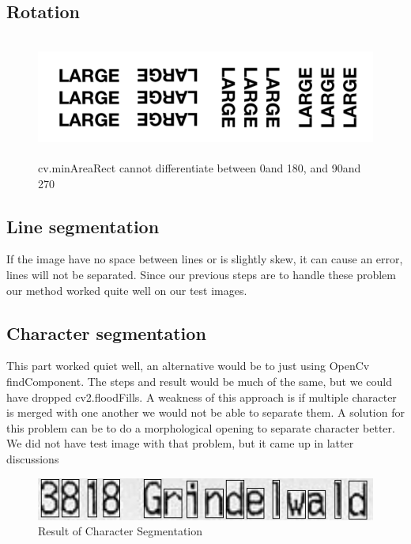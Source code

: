 \documentclass[Report.tex]{subfiles}
\begin{document}
\subsection{Rotation}
\begin{figure}[H]
  \centering
  \includegraphics[height=4cm]{res/4angle_rot.png}
  \caption{cv.minAreaRect cannot differentiate between 0\textdegree and 180\textdegree, and 90\textdegree and 270\textdegree}
  \label{fig:4angle_rot}
\end{figure}


\subsection{Line segmentation}
If the image have no space between lines or is slightly skew, it can cause an error, lines will not be separated. Since our previous steps are to handle these problem our method worked quite well on our test images. 


\subsection{Character segmentation}
This part worked quiet well, an alternative would be to just using OpenCv findComponent. The steps and result would be much of the same, but we could have dropped cv2.floodFills. A weakness of this approach is if multiple character is merged with one another we would not be able to separate them. A solution for this problem can be to do a morphological opening to separate character better. We did not have test image with that problem, but it came up in latter discussions 

\begin{figure}[H]
  \centering
  \includegraphics[width=12cm]{res/segment_letter}
  \caption{Result of Character Segmentation}
  \label{fig:Character_segmentation}
\end{figure}
\end{document}
